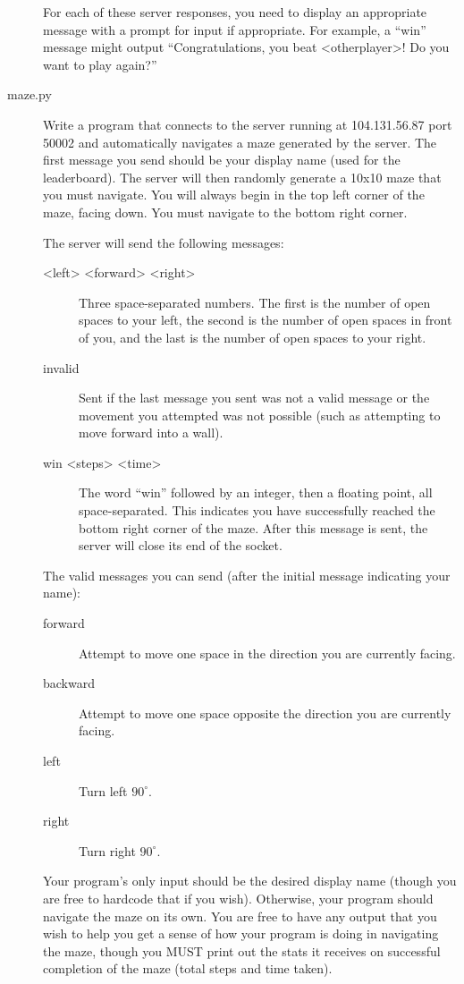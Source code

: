 \documentclass[11pt]{cselabheader}
\begin{document}
\begin{description}
  For each of these server responses, you need to display an appropriate message
  with a prompt for input if appropriate. For example, a ``win'' message might
  output ``Congratulations, you beat <otherplayer>! Do you want to play again?''

\item[maze.py] Write a program that connects to the server running at 104.131.56.87 port 50002
  and automatically navigates a maze generated by the server. The first message you send should be
  your display name (used for the leaderboard). The server will then randomly generate a 10x10
  maze that you must navigate. You will always begin in the top left corner of the maze, facing
  down. You must navigate to the bottom right corner.

  The server will send the following messages:

  \begin{description}
  \item[<left> <forward> <right>] Three space-separated numbers. The first is the number of open
    spaces to your left, the second is the number of open spaces in front of you, and the last is
    the number of open spaces to your right.
  \item[invalid] Sent if the last message you sent was not a valid message or the movement you
    attempted was not possible (such as attempting to move forward into a wall).
  \item[win <steps> <time>] The word ``win'' followed by an integer, then a floating point,
    all space-separated. This indicates you have successfully reached the bottom right corner of
    the maze. After this message is sent, the server will close its end of the socket.
  \end{description}

  The valid messages you can send (after the initial message indicating your name):

  \begin{description}
  \item[forward] Attempt to move one space in the direction you are currently facing.
  \item[backward] Attempt to move one space opposite the direction you are currently facing.
  \item[left] Turn left $90^{\circ}$.
  \item[right] Turn right $90^{\circ}$.
  \end{description}

  Your program's only input should be the desired display name (though you are free to hardcode
  that if you wish). Otherwise, your program should navigate the maze on its own. You are free
  to have any output that you wish to help you get a sense of how your program is doing in
  navigating the maze, though you MUST print out the stats it receives on successful completion of
  the maze (total steps and time taken).


\end{description}
\end{document}
